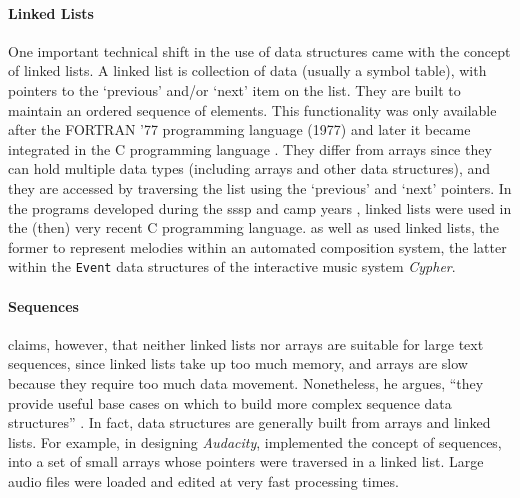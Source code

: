 \paragraph{Linked Lists}
\label{computer:linked}
One important technical shift in the use of data structures came with the concept of linked lists. A linked list is collection of data (usually a symbol table), with pointers to the `previous' and/or `next' item on the list. They are built to maintain an ordered sequence of elements. This functionality was only available after the FORTRAN '77 programming language (1977) and later it became integrated in the C programming language \parencite{kernighan_c_1978}. They differ from arrays since they can hold multiple data types (including arrays and other data structures), and they are accessed by traversing the list using the `previous' and `next' pointers. In the programs developed during the \gls{sssp} and \gls{camp} years , linked lists were used in the (then) very recent C programming language. \textcite{icmc/bbp2372.1985.040} as well as \textcite{Row92:Int} used linked lists, the former to represent melodies within an automated composition system, the latter within the \texttt{Event} data structures of the interactive music system \textit{Cypher}.

\paragraph{Sequences}
\label{computer:audacity}
\textcite{crowley98} claims, however, that neither linked lists nor arrays are suitable for large text sequences, since linked lists take up too much memory, and arrays are slow because they require too much data movement. Nonetheless, he argues, ``they provide useful base cases on which to build more complex sequence data structures'' \parencite{crowley98}. In fact, data structures are generally built from arrays and linked lists. For example, in designing \textit{Audacity}, \textcite{icmc/bbp2372.2001.051} implemented the concept of sequences, into a set of small arrays whose pointers were traversed in a linked list. Large audio files were loaded and edited at very fast processing times.
